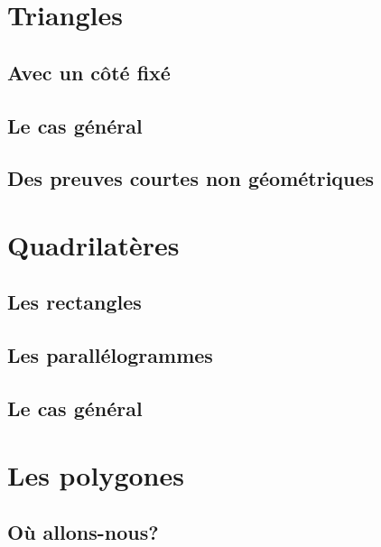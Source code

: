 \documentclass[12pt]{amsart}
\begin{document}


\section{Triangles}

\subsection{Avec un côté fixé}



\subsection{Le cas général}



\subsection{Des preuves courtes non géométriques}





\section{Quadrilatères}

\subsection{Les rectangles}



\subsection{Les parallélogrammes}



\subsection{Le cas général}





\section{Les polygones}

\subsection{Où allons-nous?}

\end{document}
